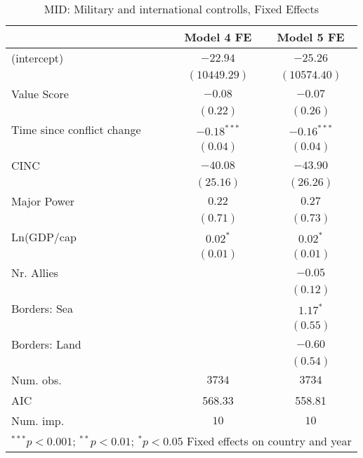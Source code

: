 
\begin{table}
\begin{center}
\begin{tabular}{l c c}
\toprule
 & Model 4 FE & Model 5 FE \\
\midrule
(intercept)                & $-22.94$      & $-25.26$      \\
                           & $(10449.29)$  & $(10574.40)$  \\
Value Score                & $-0.08$       & $-0.07$       \\
                           & $(0.22)$      & $(0.26)$      \\
Time since conflict change & $-0.18^{***}$ & $-0.16^{***}$ \\
                           & $(0.04)$      & $(0.04)$      \\
CINC                       & $-40.08$      & $-43.90$      \\
                           & $(25.16)$     & $(26.26)$     \\
Major Power                & $0.22$        & $0.27$        \\
                           & $(0.71)$      & $(0.73)$      \\
Ln(GDP/cap                 & $0.02^{*}$    & $0.02^{*}$    \\
                           & $(0.01)$      & $(0.01)$      \\
Nr. Allies                 &               & $-0.05$       \\
                           &               & $(0.12)$      \\
Borders: Sea               &               & $1.17^{*}$    \\
                           &               & $(0.55)$      \\
Borders: Land              &               & $-0.60$       \\
                           &               & $(0.54)$      \\
\midrule
Num. obs.                  & $3734$        & $3734$        \\
AIC                        & 568.33        & 558.81        \\
Num. imp.                  & $10$          & $10$          \\
\bottomrule
\multicolumn{3}{l}{\scriptsize{$^{***}p<0.001$; $^{**}p<0.01$; $^{*}p<0.05$ 
 Fixed effects on country and year}}
\end{tabular}
\caption{MID: Military and international controlls, Fixed Effects}
\label{MID_2_FE}
\end{center}
\end{table}
